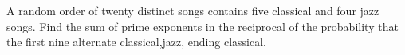 A random order of twenty distinct songs contains five classical and four jazz songs. Find the sum of prime exponents in the reciprocal of the probability that the first nine alternate classical,jazz, ending classical.
